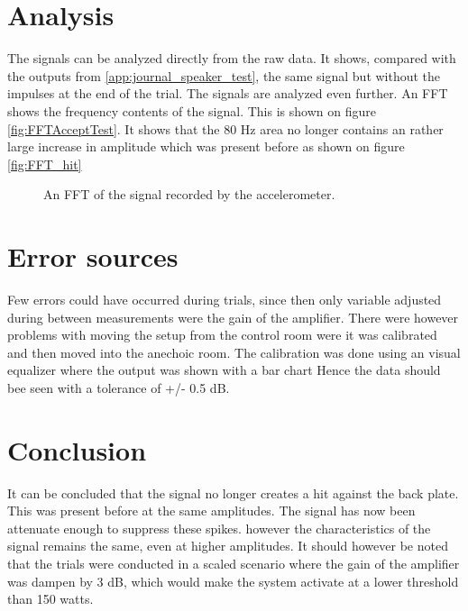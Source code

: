 \section{Analysis}

The signals can be analyzed directly from the raw data. It shows, compared with the outputs from \autoref{app:journal_speaker_test}, the same signal but without the impulses at the end of the trial. The signals are analyzed even further. An FFT shows the frequency contents of the signal. This is shown on figure \autoref{fig:FFTAcceptTest}. It shows that the 80 Hz area no longer contains an rather large increase in amplitude which was present before as shown on figure \ref{fig:FFT_hit}

\begin{figure}[H]
	\centering
	
	\caption{An FFT of the signal recorded by the accelerometer.}
	\label{fig:FFTAcceptTest}
\end{figure}

\section{Error sources}

Few errors could have occurred during trials, since then only variable adjusted during between measurements were the gain of the amplifier. There were however problems with moving the setup from the control room were it was calibrated and then moved into the anechoic room. The calibration was done using an visual equalizer where the output was shown with a bar chart Hence the data should bee seen with a tolerance of +/- 0.5 dB.


\section{Conclusion}

It can be concluded that the signal no longer creates a hit against the back plate. This was present before at the same amplitudes. The signal has now been attenuate enough to suppress these spikes. however the characteristics of the signal remains the same, even at higher amplitudes. It should however be noted that the trials were conducted in a scaled scenario where the gain of the amplifier was dampen by 3 dB, which would make the system activate at a lower threshold than 150 watts.  
